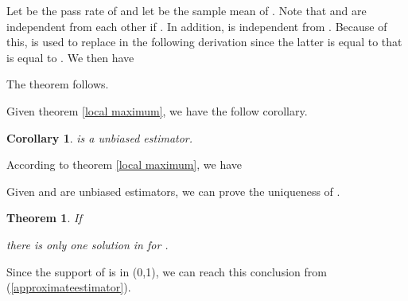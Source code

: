 \documentclass[10pt,onecolumn]{IEEEtran}
\newtheorem{theorem}{\bf Theorem}
\newtheorem{corollary}{\bf Corollary}
\begin{document}
\begin{IEEEproof}
Let  be the pass rate of  and let   be the sample mean of . Note that  and  are independent from each other if . In addition,  is independent from . Because of this,  is used to replace  in the following derivation since the latter is equal to  that is equal to . We then have




The theorem follows.
\end{IEEEproof}
Given theorem \ref{local maximum}, we have the follow corollary.
 \begin{corollary} \label{global expect}
  is a unbiased estimator.
 \end{corollary}
    \begin{IEEEproof}
According to theorem \ref{local maximum}, we have

\end{IEEEproof}

Given  and  are unbiased estimators,
we can prove the uniqueness of .










\begin{theorem}
If

there is only one solution in  for .
\end{theorem}
\begin{IEEEproof}
Since the support of  is in (0,1), we can reach this conclusion from (\ref{approximateestimator}).
\end{IEEEproof}
\end{document}
